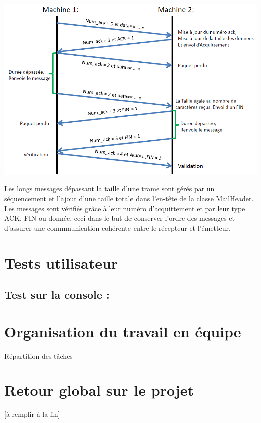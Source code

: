 \documentclass[12pt]{report}
\begin{document}
\begin{center}
\includegraphics[scale=0.6]{protocoleReseau}
\end{center}

\bigskip


Les longs messages dépassant la taille d’une trame sont gérés par
un séquencement et l’ajout d'une taille totale dans l’en-tête de la classe MailHeader. \\


Les messages sont vérifiés grâce à leur numéro d'acquittement et par leur type ACK, FIN ou donnée, ceci dans le but de conserver l'ordre des messages et d'assurer une commmunication cohérente entre le récepteur et l'émetteur.


\chapter{Tests utilisateur}
\section{Test sur la console :}



\chapter{Organisation du travail en équipe}
Répartition des tâches



\chapter{Retour global sur le projet}

[à remplir à la fin]
\end{document}

